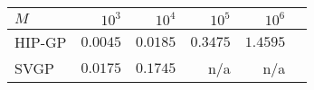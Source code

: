 \begin{tabular}{lrrrrr}
\toprule
$M$ &     $10^3$       & $10^4$     & $10^5$     & $10^6$  \\
\midrule
HIP-GP   &  $\mathbf{0.0045}$  &  $\mathbf{0.0185}$  &  $\mathbf{0.3475}$  &  $\mathbf{1.4595}$  \\
SVGP     &  $0.0175$ &  $0.1745$  &   n/a      & n/a       \\
\bottomrule
\end{tabular}
